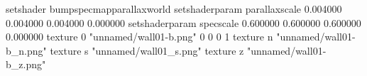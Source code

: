 setshader bumpspecmapparallaxworld
setshaderparam parallaxscale 0.004000 0.004000 0.004000 0.000000
setshaderparam specscale 0.600000 0.600000 0.600000 0.000000
texture 0 "unnamed/wall01-b.png" 0 0 0 1
texture n "unnamed/wall01-b_n.png"
texture s "unnamed/wall01_s.png"
texture z "unnamed/wall01-b_z.png"